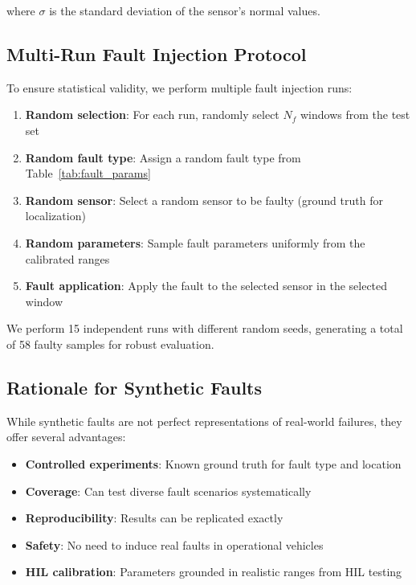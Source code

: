 where $\sigma$ is the standard deviation of the sensor's normal values.

\subsection{Multi-Run Fault Injection Protocol}

To ensure statistical validity, we perform multiple fault injection runs:

\begin{enumerate}
    \item \textbf{Random selection}: For each run, randomly select $N_f$ windows from the test set
    \item \textbf{Random fault type}: Assign a random fault type from Table~\ref{tab:fault_params}
    \item \textbf{Random sensor}: Select a random sensor to be faulty (ground truth for localization)
    \item \textbf{Random parameters}: Sample fault parameters uniformly from the calibrated ranges
    \item \textbf{Fault application}: Apply the fault to the selected sensor in the selected window
\end{enumerate}

We perform 15 independent runs with different random seeds, generating a total of 58 faulty samples for robust evaluation.

\subsection{Rationale for Synthetic Faults}

While synthetic faults are not perfect representations of real-world failures, they offer several advantages:

\begin{itemize}
    \item \textbf{Controlled experiments}: Known ground truth for fault type and location
    \item \textbf{Coverage}: Can test diverse fault scenarios systematically
    \item \textbf{Reproducibility}: Results can be replicated exactly
    \item \textbf{Safety}: No need to induce real faults in operational vehicles
    \item \textbf{HIL calibration}: Parameters grounded in realistic ranges from HIL testing
\end{itemize}


